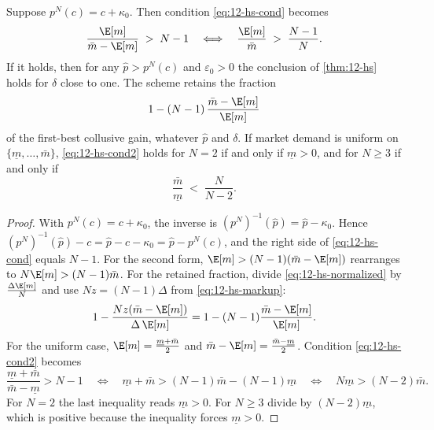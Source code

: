 \begin{corollary}\label{cor:12-hs}
Suppose $p^N(c) = c + \kappa_0$. Then condition \eqref{eq:12-hs-cond} becomes
\begin{equation}\label{eq:12-hs-cond2}
  \frac{\E[m]}{\bar m - \E[m]} \;>\; N - 1
  \quad\Longleftrightarrow\quad
  \frac{\E[m]}{\bar m} \;>\; \frac{N-1}{N} .
\end{equation}
If it holds, then for any $\hat p > p^N(c)$ and $\varepsilon_0 > 0$ the conclusion of \cref{thm:12-hs} holds for
$\delta$ close to one. The scheme retains the fraction
\begin{equation}\label{eq:12-hs-retained}
  1 - (N-1)\,\frac{\bar m - \E[m]}{\E[m]}
\end{equation}
of the first-best collusive gain, whatever $\hat p$ and $\delta$. If market demand is uniform on
$\{\underline m, \dots, \bar m\}$, \eqref{eq:12-hs-cond2} holds for $N = 2$ if and only if $\underline m > 0$, and
for $N \ge 3$ if and only if
\begin{equation}\label{eq:12-hs-uniform}
  \frac{\bar m}{\underline m} \;<\; \frac{N}{N-2} .
\end{equation}
\end{corollary}

\begin{proof}
With $p^N(c) = c + \kappa_0$, the inverse is $(p^N)^{-1}(\hat p) = \hat p - \kappa_0$. Hence
$(p^N)^{-1}(\hat p) - c = \hat p - c - \kappa_0 = \hat p - p^N(c)$, and the right side of \eqref{eq:12-hs-cond}
equals $N - 1$. For the second form, $\E[m] > (N-1)(\bar m - \E[m])$ rearranges to $N\E[m] > (N-1)\bar m$. For the
retained fraction, divide \eqref{eq:12-hs-normalized} by $\frac{\Delta\E[m]}{N}$ and use
$Nz = (N-1)\Delta$ from \eqref{eq:12-hs-markup}:
\begin{equation*}
  1 - \frac{Nz(\bar m - \E[m])}{\Delta\,\E[m]} = 1 - (N-1)\frac{\bar m - \E[m]}{\E[m]} .
\end{equation*}
For the uniform case, $\E[m] = \frac{\underline m + \bar m}{2}$ and $\bar m - \E[m] = \frac{\bar m - \underline m}{2}$.
Condition \eqref{eq:12-hs-cond2} becomes
\begin{equation*}
  \frac{\underline m + \bar m}{\bar m - \underline m} > N - 1
  \quad\Longleftrightarrow\quad
  \underline m + \bar m > (N-1)\bar m - (N-1)\underline m
  \quad\Longleftrightarrow\quad
  N\underline m > (N-2)\bar m .
\end{equation*}
For $N = 2$ the last inequality reads $\underline m > 0$. For $N \ge 3$ divide by $(N-2)\underline m$, which is
positive because the inequality forces $\underline m > 0$.
\end{proof}


